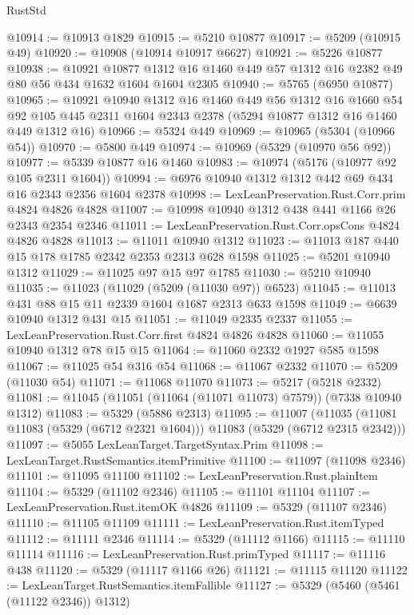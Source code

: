 \begin{lexlean}{RustStd}
\begin{coremodule}
@10914 := @10913 @1829
@10915 := @5210 @10877
@10917 := @5209 (@10915 @49)
@10920 := @10908 (@10914 @10917 @6627)
@10921 := @5226 @10877
@10938 := @10921
    @10877
    @1312
    @16
    @1460
    @449
    @57
    @1312
    @16
    @2382
    @49
    @80
    @56
    @434
    @1632
    @1604
    @1604
    @2305
@10940 := @5765 (@6950 @10877)
@10965 := @10921
    @10940
    @1312
    @16
    @1460
    @449
    @56
    @1312
    @16
    @1660
    @54
    @92
    @105
    @445
    @2311
    @1604
    @2343
    @2378
    (@5294 @10877 @1312 @16 @1460 @449 @1312 @16)
@10966 := @5324 @449
@10969 := @10965 (@5304 (@10966 @54))
@10970 := @5800 @449
@10974 := @10969 (@5329 (@10970 @56 @92))
@10977 := @5339 @10877 @16 @1460
@10983 := @10974 (@5176 (@10977 @92 @105 @2311 @1604))
@10994 := @6976 @10940 @1312 @1312 @442 @69 @434 @16 @2343 @2356 @1604 @2378
@10998 := LexLeanPreservation.Rust.Corr.prim @4824 @4826 @4828
@11007 := @10998 @10940 @1312 @438 @441 @1166 @26 @2343 @2354 @2346
@11011 := LexLeanPreservation.Rust.Corr.opsCons @4824 @4826 @4828
@11013 := @11011 @10940 @1312
@11023 := @11013 @187 @440 @15 @178 @1785 @2342 @2353 @2313 @628 @1598
@11025 := @5201 @10940 @1312
@11029 := @11025 @97 @15 @97 @1785
@11030 := @5210 @10940
@11035 := @11023 (@11029 (@5209 (@11030 @97)) @6523)
@11045 := @11013 @431 @88 @15 @11 @2339 @1604 @1687 @2313 @633 @1598
@11049 := @6639 @10940 @1312 @431 @15
@11051 := @11049 @2335 @2337
@11055 := LexLeanPreservation.Rust.Corr.first @4824 @4826 @4828
@11060 := @11055 @10940 @1312 @78 @15 @15
@11064 := @11060 @2332 @1927 @585 @1598
@11067 := @11025 @54 @316 @54
@11068 := @11067 @2332
@11070 := @5209 (@11030 @54)
@11071 := @11068 @11070
@11073 := @5217 (@5218 @2332)
@11081 := @11045 (@11051 (@11064 (@11071 @11073) @7579)) (@7338 @10940 @1312)
@11083 := @5329 (@5886 @2313)
@11095 := @11007
    (@11035 (@11081 @11083 (@5329 (@6712 @2321 @1604))) @11083 (@5329 (@6712 @2315 @2342)))
@11097 := @5055 LexLeanTarget.TargetSyntax.Prim
@11098 := LexLeanTarget.RustSemantics.itemPrimitive
@11100 := @11097 (@11098 @2346)
@11101 := @11095 @11100
@11102 := LexLeanPreservation.Rust.plainItem
@11104 := @5329 (@11102 @2346)
@11105 := @11101 @11104
@11107 := LexLeanPreservation.Rust.itemOK @4826
@11109 := @5329 (@11107 @2346)
@11110 := @11105 @11109
@11111 := LexLeanPreservation.Rust.itemTyped
@11112 := @11111 @2346
@11114 := @5329 (@11112 @1166)
@11115 := @11110 @11114
@11116 := LexLeanPreservation.Rust.primTyped
@11117 := @11116 @438
@11120 := @5329 (@11117 @1166 @26)
@11121 := @11115 @11120
@11122 := LexLeanTarget.RustSemantics.itemFallible
@11127 := @5329 (@5460 (@5461 (@11122 @2346)) @1312)

\end{coremodule}
\end{lexlean}
